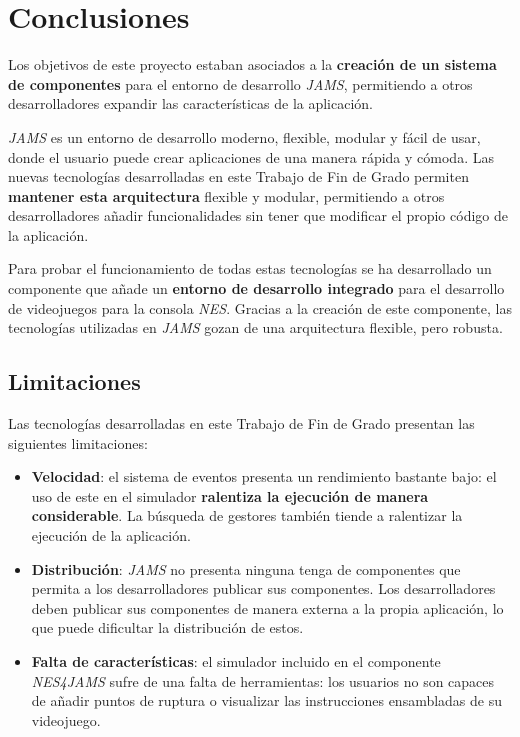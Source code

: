 \chapter{Conclusiones}\label{ch:conclusiones}

Los objetivos de este proyecto estaban asociados
a la \textbf{creación de un sistema de componentes}
para el entorno de desarrollo \textit{JAMS}, permitiendo
a otros desarrolladores expandir las características
de la aplicación.

\textit{JAMS} es un entorno de desarrollo moderno,
flexible, modular y fácil de usar, donde el usuario
puede crear aplicaciones de una manera rápida y cómoda.
Las nuevas tecnologías desarrolladas en este
Trabajo de Fin de Grado permiten \textbf{mantener esta arquitectura}
flexible y modular, permitiendo a otros desarrolladores
añadir funcionalidades sin tener que modificar el propio
código de la aplicación.

Para probar el funcionamiento de todas estas tecnologías
se ha desarrollado un componente que añade un \textbf{entorno
de desarrollo integrado} para el desarrollo de videojuegos
para la consola \textit{NES}.
Gracias a la creación de este componente, las tecnologías
utilizadas en \textit{JAMS} gozan de una arquitectura
flexible, pero robusta.

\section{Limitaciones}\label{sec:limitaciones}

Las tecnologías desarrolladas en este Trabajo
de Fin de Grado presentan las siguientes limitaciones:

\begin{itemize}
    \item \textbf{Velocidad}: el sistema de eventos
    presenta un rendimiento bastante bajo: el uso
    de este en el simulador \textbf{ralentiza la ejecución
    de manera considerable}.
    La búsqueda de gestores también tiende a ralentizar
    la ejecución de la aplicación.
    \item \textbf{Distribución}: \textit{JAMS} no presenta
    ninguna tenga  de componentes que permita a los desarrolladores
    publicar sus componentes.
    Los desarrolladores deben publicar sus componentes de manera
    externa a la propia aplicación, lo que puede dificultar
    la distribución de estos.
    \item \textbf{Falta de características}: el simulador
    incluido en el componente \textit{NES4JAMS} sufre
    de una falta de herramientas: los usuarios no son
    capaces de añadir puntos de ruptura o visualizar
    las instrucciones ensambladas de su videojuego.
\end{itemize}

